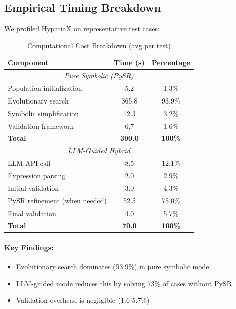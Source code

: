 \documentclass[twoside,11pt]{article}
\begin{document}
\subsection{Empirical Timing Breakdown}

We profiled HypatiaX on representative test cases:

\begin{table}[H]
\centering
\caption{Computational Cost Breakdown (avg per test)}
\label{tab:timing_breakdown}
\begin{tabular}{@{}lcc@{}}
\toprule
\textbf{Component} & \textbf{Time (s)} & \textbf{Percentage} \\
\midrule
\multicolumn{3}{c}{\textit{Pure Symbolic (PySR)}} \\
\midrule
Population initialization & 5.2 & 1.3\% \\
Evolutionary search & 365.8 & 93.9\% \\
Symbolic simplification & 12.3 & 3.2\% \\
Validation framework & 6.7 & 1.6\% \\
\midrule
\textbf{Total} & \textbf{390.0} & \textbf{100\%} \\
\midrule
\multicolumn{3}{c}{\textit{LLM-Guided Hybrid}} \\\citep{kambhampati2024llms}
\midrule
LLM API call & 8.5 & 12\citep{kambhampati2024llms}.1\% \\
Expression parsing & 2.0 & 2.9\% \\
Initial validation & 3.0 & 4.3\% \\
PySR refinement (when needed) & 52.5 & 75.0\% \\
Final validation & 4.0 & 5.7\% \\
\midrule
\textbf{Total} & \textbf{70.0} & \textbf{100\%} \\
\bottomrule
\end{tabular}
\end{table}

\paragraph{Key Findings:}
\begin{itemize}
\item Evolutionary search dominates (93.9\%) in pure symbolic mode
\item LLM-guided mode reduces this by solving 73\% of cases without PySR\citep{kambhampati2024llms}
\item Validation overhead is negligible (1.6-5.7\%)
\end{itemize}
\end{document}
